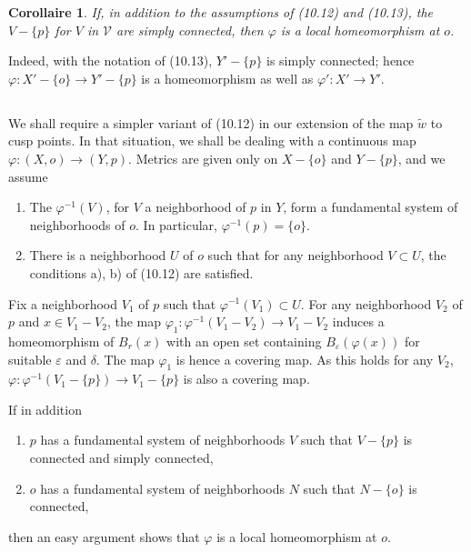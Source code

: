 \documentclass[12pt,a4paper]{article}
\theoremstyle{plain}
\newtheorem{corollary}[theorem]{Corollaire}
\theoremstyle{definition}
\theoremstyle{remark}
\begin{document}
\begin{corollary}
\label{10.13.3}
If, in addition to the assumptions of (10.12) and (10.13), the $V - \{p\}$ for $V$ in $\mathscr{V}$ are simply connected, then $\varphi$ is a local homeomorphism at $o$.
\end{corollary}

Indeed, with the notation of (10.13), $Y' - \{p\}$ is simply connected; hence $\varphi : X' - \{o\} \to Y' - \{p\}$ is a homeomorphism as well as $\varphi' : X' \to Y'$.

\subsection{}
\label{10.14}

We shall require a simpler variant of (10.12) in our extension of the map $\widetilde{w}$ to cusp points. In that situation, we shall be dealing with a continuous map $\varphi : (X, o) \to (Y, p)$. Metrics are given only on $X - \{o\}$ and $Y - \{p\}$, and we assume
\begin{enumerate}
\item[a)] The $\varphi^{-1}(V)$, for $V$ a neighborhood of $p$ in $Y$, form a fundamental system of neighborhoods of $o$. In particular, $\varphi^{-1}(p) = \{o\}$.
\item[b)] There is a neighborhood $U$ of $o$ such that for any neighborhood $V \subset U$, the conditions a), b) of (10.12) are satisfied.
\end{enumerate}

Fix a neighborhood $V_1$ of $p$ such that $\varphi^{-1}(V_1) \subset U$. For any neighborhood $V_2$ of $p$ and $x \in V_1 - V_2$, the map $\varphi_1 : \varphi^{-1}(V_1 - V_2) \to V_1 - V_2$ induces a homeomorphism of $B_r(x)$ with an open set containing $B_\varepsilon(\varphi(x))$ for suitable $\varepsilon$ and $\delta$. The map $\varphi_1$ is hence a covering map. As this holds for any $V_2$, $\varphi : \varphi^{-1}(V_1 - \{p\}) \to V_1 - \{p\}$ is also a covering map.

If in addition
\begin{enumerate}
\item[c)] $p$ has a fundamental system of neighborhoods $V$ such that $V - \{p\}$ is connected and simply connected,
\item[d)] $o$ has a fundamental system of neighborhoods $N$ such that $N - \{o\}$ is connected,
\end{enumerate}
then an easy argument shows that $\varphi$ is a local homeomorphism at $o$.
\end{document}
